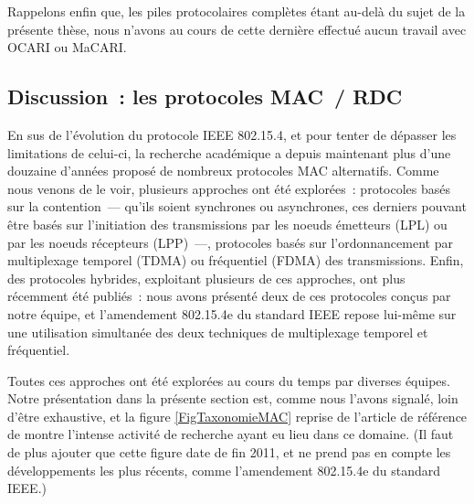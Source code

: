 \smallskip

Rappelons enfin que, les piles protocolaires complètes étant au-delà
du sujet de la présente thèse, nous n'avons au cours de cette dernière
effectué aucun travail avec OCARI ou MaCARI.


\subsection{Discussion~: les protocoles MAC~/ RDC}
\label{SubsecDiscussMAC}

En sus de l'évolution du protocole IEEE 802.15.4, et pour tenter de
dépasser les limitations de celui-ci, la recherche académique a depuis
maintenant plus d'une douzaine d'années proposé de nombreux protocoles
MAC alternatifs. Comme nous venons de le voir, plusieurs approches
ont été explorées~: protocoles basés sur la contention~--- qu'ils soient
synchrones ou asynchrones, ces derniers pouvant être basés sur
l'initiation des transmissions par les noeuds émetteurs (LPL) ou
par les noeuds récepteurs (LPP)~---, protocoles basés sur l'ordonnancement
par multiplexage temporel (TDMA) ou fréquentiel (FDMA) des transmissions.
Enfin, des protocoles hybrides, exploitant plusieurs de ces approches,
ont plus récemment été publiés~: nous avons présenté deux de ces
protocoles conçus par notre équipe, et l'amendement 802.15.4e du
standard IEEE repose lui-même sur une utilisation simultanée des
deux techniques de multiplexage temporel et fréquentiel.

Toutes ces approches ont été explorées au cours du temps par diverses
équipes. Notre présentation dans la présente section est, comme nous
l'avons signalé, loin d'être exhaustive, et la figure \vref{FigTaxonomieMAC}
reprise de l'article de référence de \cite{Evolution-MAC-WSN-Survey-2013}
montre l'intense activité de recherche ayant eu lieu dans ce domaine.
(Il faut de plus ajouter que cette figure date de fin 2011, et
ne prend pas en compte les développements les plus récents,
comme l'amendement 802.15.4e du standard IEEE.)

